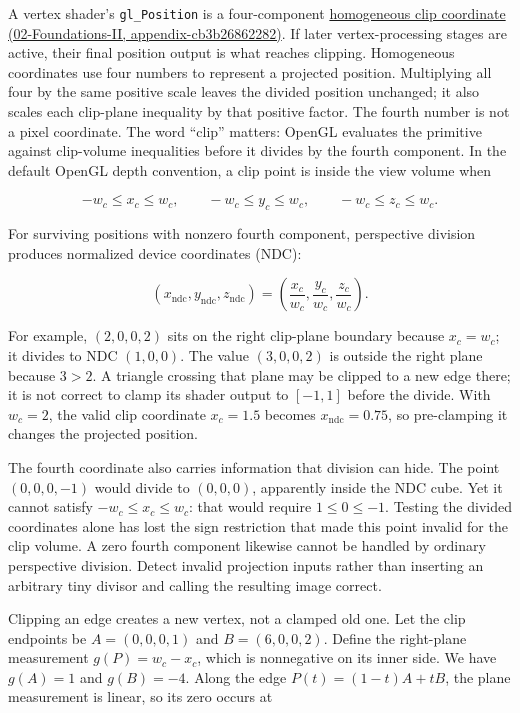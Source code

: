 A vertex shader's \texttt{gl\_Position} is a four-component \href{}{homogeneous clip coordinate (02-Foundations-II, appendix-cb3b26862282)}. If later vertex-processing stages are active, their final position output is what reaches clipping. Homogeneous coordinates use four numbers to represent a projected position. Multiplying all four by the same positive scale leaves the divided position unchanged; it also scales each clip-plane inequality by that positive factor. The fourth number is not a pixel coordinate. The word ``clip'' matters: OpenGL evaluates the primitive against clip-volume inequalities before it divides by the fourth component. In the default OpenGL depth convention, a clip point is inside the view volume when

\[
-w_c\le x_c\le w_c,\qquad
-w_c\le y_c\le w_c,\qquad
-w_c\le z_c\le w_c.
\]

For surviving positions with nonzero fourth component, perspective division produces normalized device coordinates (NDC):

\[
(x_{\mathrm{ndc}},y_{\mathrm{ndc}},z_{\mathrm{ndc}})=
\left(\frac{x_c}{w_c},\frac{y_c}{w_c},\frac{z_c}{w_c}\right).
\]

For example, \((2,0,0,2)\) sits on the right clip-plane boundary because \(x_c=w_c\); it divides to NDC \((1,0,0)\). The value \((3,0,0,2)\) is outside the right plane because \(3>2\). A triangle crossing that plane may be clipped to a new edge there; it is not correct to clamp its shader output to \([-1,1]\) before the divide. With \(w_c=2\), the valid clip coordinate \(x_c=1.5\) becomes \(x_{\mathrm{ndc}}=0.75\), so pre-clamping it changes the projected position.

The fourth coordinate also carries information that division can hide. The point \((0,0,0,-1)\) would divide to \((0,0,0)\), apparently inside the NDC cube. Yet it cannot satisfy \(-w_c\leq x_c\leq w_c\): that would require \(1\leq0\leq-1\). Testing the divided coordinates alone has lost the sign restriction that made this point invalid for the clip volume. A zero fourth component likewise cannot be handled by ordinary perspective division. Detect invalid projection inputs rather than inserting an arbitrary tiny divisor and calling the resulting image correct.

Clipping an edge creates a new vertex, not a clamped old one. Let the clip endpoints be \(A=(0,0,0,1)\) and \(B=(6,0,0,2)\). Define the right-plane measurement \(g(P)=w_c-x_c\), which is nonnegative on its inner side. We have \(g(A)=1\) and \(g(B)=-4\). Along the edge \(P(t)=(1-t)A+tB\), the plane measurement is linear, so its zero occurs at

